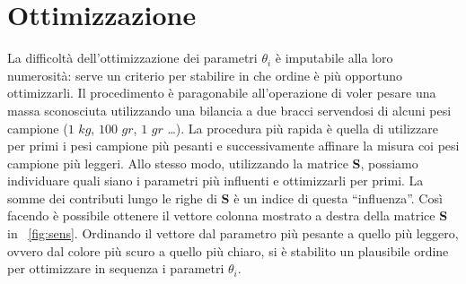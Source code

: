 \section{Ottimizzazione}
La difficoltà dell'ottimizzazione dei parametri $\theta_i$ è imputabile alla loro numerosità: serve un criterio per stabilire in che ordine è più opportuno ottimizzarli. Il procedimento è paragonabile all'operazione di voler pesare una massa sconosciuta utilizzando una bilancia a due bracci servendosi di alcuni pesi campione ($1$ $kg$, $100$ $gr$, $1$ $gr$ \dots). La procedura più rapida è quella di utilizzare per primi i pesi campione più pesanti e successivamente affinare la misura coi pesi campione più leggeri. Allo stesso modo, utilizzando la matrice \textbf{S}, possiamo individuare quali siano i parametri più  influenti e ottimizzarli per primi. La somme dei contributi lungo le righe di \textbf{S} è un indice di questa ``influenza''. Così facendo è possibile ottenere il vettore colonna mostrato a destra della matrice \textbf{S} in \figurename~\ref{fig:sens}. Ordinando il vettore dal parametro più pesante a quello più leggero, ovvero dal colore più scuro a quello più chiaro, si è stabilito un plausibile ordine per ottimizzare in sequenza i parametri $\theta_i$.

